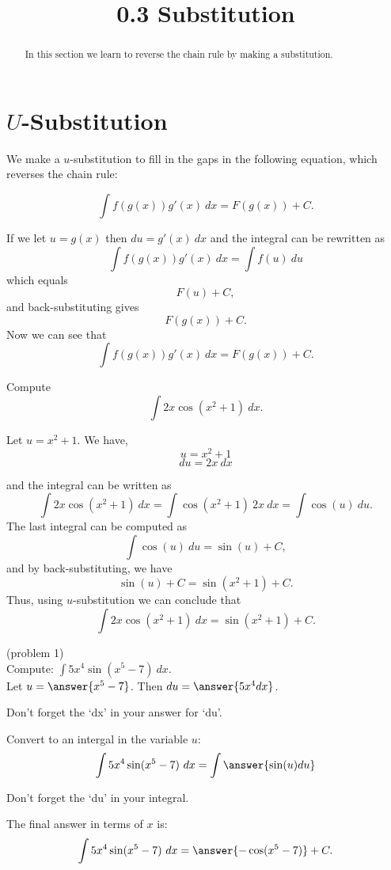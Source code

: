 \documentclass{ximera}
\title{0.3 Substitution}
\begin{document}
\begin{abstract}
In this section we learn to reverse the chain rule by making a substitution.
\end{abstract}

\maketitle

\section{$U$-Substitution}

We make a $u$-substitution to fill in the gaps in the following equation, which reverses the chain rule:

\[\int f(g(x))g'(x) \ dx = F(g(x)) + C. \]

If we let $ u = g(x)$ then $du = g'(x) \ dx$ and the integral can be rewritten as
\[\int f(g(x))g'(x) \ dx = \int f(u) \ du \]
which equals
\[F(u) + C,\]
and back-substituting gives
\[F(g(x)) + C. \]
Now we can see that
\[\int f(g(x))g'(x) \ dx = F(g(x)) + C. \]



\begin{example}[example 1]
Compute 
\[\int 2x\cos(x^2 + 1) \ dx.\]

Let $u = x^2 + 1$.  We have,
\[u = x^2 + 1\]
\[du = 2x \ dx\]

and the integral can be written as 
\[\int 2x\cos(x^2 + 1) \ dx = \int \cos(x^2 + 1) \ 2x\  dx = \int \cos(u) \ du.\]
The last integral can be computed as 
\[\int \cos(u) \ du = \sin(u) + C,\]
and by back-substituting, we have 
\[\sin(u) + C = \sin(x^2 + 1) + C.\]
Thus, using $u$-substitution we can conclude that
\[\int 2x\cos(x^2 + 1) \ dx =  \sin(x^2 + 1) + C.\]
\end{example}



\begin{problem}(problem 1)\\ Compute: $\displaystyle{\int 5x^4\sin(x^5 -7) \ dx}$.\\
Let $u = \answer{x^5 - 7}$. Then $du = \answer{5x^4 dx}$.\\
\begin{hint}
Don't forget the `dx' in your answer for `du'.
\end{hint}
Convert to an intergal in the variable $u$:
\[\int 5x^4\sin(x^5 -7) \ dx = \int\answer{\sin(u) du}\]
\begin{hint}
Don't forget the `du' in your integral.
\end{hint}
The final answer in terms of $x$ is:
\[\int 5x^4\sin(x^5 -7) \ dx = \answer{-\cos(x^5 -7)} +C.\]
\end{problem}
\end{document}
